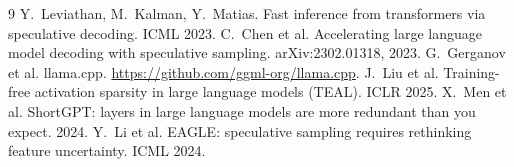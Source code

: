 \documentclass[10pt]{article}
\begin{document}
\begin{thebibliography}{9}\small
{} Y.~Leviathan, M.~Kalman, Y.~Matias. Fast inference from transformers via speculative decoding.
ICML 2023.
 C.~Chen et al. Accelerating large language model decoding with speculative sampling. arXiv:2302.01318,
2023.
 G.~Gerganov et al. llama.cpp. \url{https://github.com/ggml-org/llama.cpp}.
 J.~Liu et al. Training-free activation sparsity in large language models (TEAL). ICLR 2025.
 X.~Men et al. ShortGPT: layers in large language models are more redundant than you expect. 2024.
 Y.~Li et al. EAGLE: speculative sampling requires rethinking feature uncertainty. ICML 2024.
\end{thebibliography}
\end{document}
